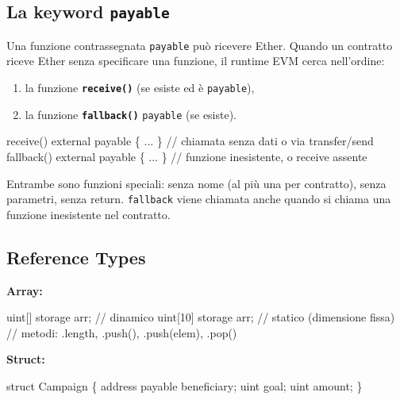 \documentclass[
  italian,
  openany]{book}
\newenvironment{Shaded}{\begin{snugshade}}{\end{snugshade}}
\newcommand{\NormalTok}[1]{#1}
\providecommand{\tightlist}{%
  \setlength{\itemsep}{0pt}\setlength{\parskip}{0pt}}
\begin{document}
\subsection{\texorpdfstring{La keyword
\texttt{payable}}{La keyword payable}}\label{la-keyword-payable}

Una funzione contrassegnata \texttt{payable} può ricevere Ether. Quando
un contratto riceve Ether senza specificare una funzione, il runtime EVM
cerca nell'ordine:

\begin{enumerate}
\def\labelenumi{\arabic{enumi}.}
\tightlist
\item
  la funzione \textbf{\texttt{receive()}} (se esiste ed è
  \texttt{payable}),
\item
  la funzione \textbf{\texttt{fallback()}} \texttt{payable} (se esiste).
\end{enumerate}

\begin{Shaded}
\begin{Highlighting}[]
\NormalTok{receive() external payable \{ ... \}   // chiamata senza dati o via transfer/send}
\NormalTok{fallback() external payable \{ ... \}  // funzione inesistente, o receive assente}
\end{Highlighting}
\end{Shaded}

Entrambe sono funzioni speciali: senza nome (al più una per contratto),
senza parametri, senza return. \texttt{fallback} viene chiamata anche
quando si chiama una funzione inesistente nel contratto.

\subsection{Reference Types}\label{reference-types}

\textbf{Array:}

\begin{Shaded}
\begin{Highlighting}[]
\NormalTok{uint[] storage arr;          // dinamico}
\NormalTok{uint[10] storage arr;        // statico (dimensione fissa)}
\NormalTok{// metodi: .length, .push(), .push(elem), .pop()}
\end{Highlighting}
\end{Shaded}

\textbf{Struct:}

\begin{Shaded}
\begin{Highlighting}[]
\NormalTok{struct Campaign \{}
\NormalTok{    address payable beneficiary;}
\NormalTok{    uint goal;}
\NormalTok{    uint amount;}
\NormalTok{\}}
\end{Highlighting}
\end{Shaded}
\end{document}
